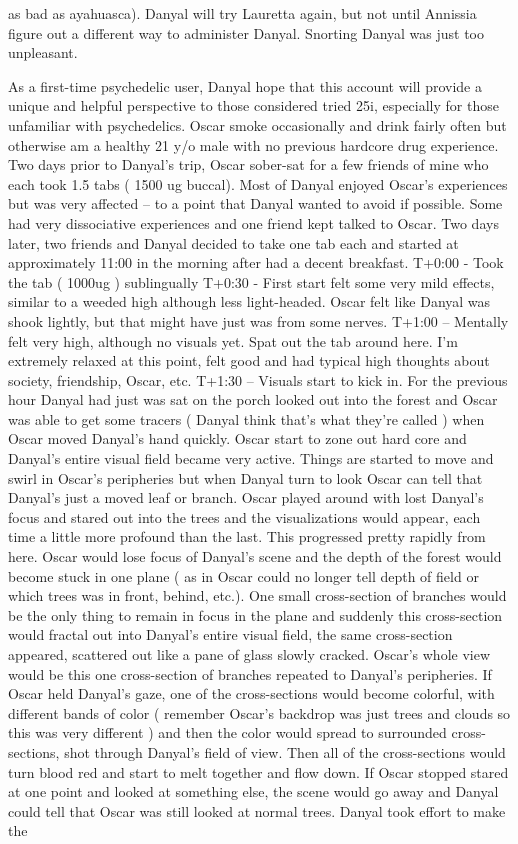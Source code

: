 \documentclass[12pt]{book}
\begin{document}
as bad as ayahuasca). Danyal will try Lauretta again, but not until Annissia figure out a different way to administer Danyal. Snorting Danyal was just too unpleasant.



As a first-time psychedelic user, Danyal hope that this account will provide a unique and helpful perspective to those considered tried 25i, especially for those unfamiliar with psychedelics. Oscar smoke occasionally and drink fairly often but otherwise am a healthy 21 y/o male with no previous hardcore drug experience. Two days prior to Danyal's trip, Oscar sober-sat for a few friends of mine who each took 1.5 tabs ( 1500 ug buccal). Most of Danyal enjoyed Oscar's experiences but was very affected -- to a point that Danyal wanted to avoid if possible. Some had very dissociative experiences and one friend kept talked to Oscar. Two days later, two friends and Danyal decided to take one tab each and started at approximately 11:00 in the morning after had a decent breakfast. T+0:00 - Took the tab ( 1000ug ) sublingually T+0:30 - First start felt some very mild effects, similar to a weeded high although less light-headed. Oscar felt like Danyal was shook lightly, but that might have just was from some nerves. T+1:00 -- Mentally felt very high, although no visuals yet. Spat out the tab around here. I'm extremely relaxed at this point, felt good and had typical high thoughts about society, friendship, Oscar, etc. T+1:30 -- Visuals start to kick in. For the previous hour Danyal had just was sat on the porch looked out into the forest and Oscar was able to get some tracers ( Danyal think that's what they're called ) when Oscar moved Danyal's hand quickly. Oscar start to zone out hard core and Danyal's entire visual field became very active. Things are started to move and swirl in Oscar's peripheries but when Danyal turn to look Oscar can tell that Danyal's just a moved leaf or branch. Oscar played around with lost Danyal's focus and stared out into the trees and the visualizations would appear, each time a little more profound than the last. This progressed pretty rapidly from here. Oscar would lose focus of Danyal's scene and the depth of the forest would become stuck in one plane ( as in Oscar could no longer tell depth of field or which trees was in front, behind, etc.). One small cross-section of branches would be the only thing to remain in focus in the plane and suddenly this cross-section would fractal out into Danyal's entire visual field, the same cross-section appeared, scattered out like a pane of glass slowly cracked. Oscar's whole view would be this one cross-section of branches repeated to Danyal's peripheries. If Oscar held Danyal's gaze, one of the cross-sections would become colorful, with different bands of color ( remember Oscar's backdrop was just trees and clouds so this was very different ) and then the color would spread to surrounded cross-sections, shot through Danyal's field of view. Then all of the cross-sections would turn blood red and start to melt together and flow down. If Oscar stopped stared at one point and looked at something else, the scene would go away and Danyal could tell that Oscar was still looked at normal trees. Danyal took effort to make the 
\end{document}
